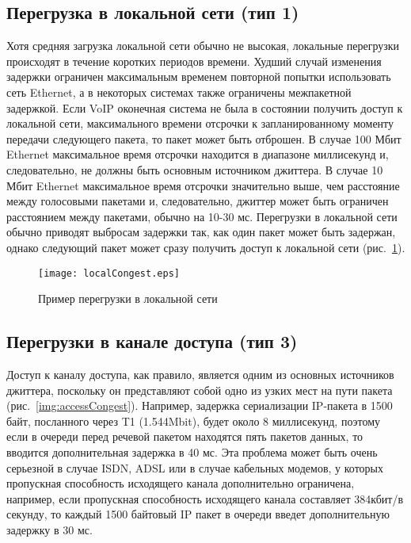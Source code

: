 \subsection{Перегрузка в локальной сети (тип 1)} \label{subsect2_1_2}
Хотя средняя загрузка локальной сети обычно не высокая, локальные перегрузки происходят в течение коротких периодов времени. Худший случай изменения задержки ограничен максимальным временем повторной попытки использовать сеть Ethernet, а в некоторых системах также ограничены межпакетной задержкой.
Если VoIP оконечная система не была в состоянии получить доступ к локальной сети, максимального времени отсрочки к запланированному моменту передачи следующего пакета, то пакет может быть отброшен. В случае 100 Мбит Ethernet максимальное время отсрочки находится в диапазоне миллисекунд и, следовательно, не должны быть основным источником джиттера. В случае 10 Мбит Ethernet максимальное время отсрочки значительно выше, чем расстояние между голосовыми пакетами и, следовательно, джиттер может быть ограничен расстоянием между пакетами, обычно на 10-30 мс.
Перегрузки в локальной сети обычно приводят выбросам задержки так, как один пакет может быть задержан, однако следующий пакет может сразу получить доступ к локальной сети (рис. \ref{img:localCongest}).

\begin{figure} [h]
  \center
\texttt{[image: localCongest.eps]}
  \caption{Пример перегрузки в локальной сети \cite{clark}}
  \label{img:localCongest}
\end{figure}

\subsection{Перегрузки в канале доступа (тип 3) } \label{subsect2_1_3}
Доступ к каналу доступа, как правило, является одним из основных источников джиттера, поскольку он представляют собой одно из узких мест на пути пакета (рис. \ref{img:accessCongest}). Например, задержка сериализации IP-пакета в 1500 байт, посланного через T1 (1.544Mbit), будет около 8 миллисекунд, поэтому если в очереди перед речевой пакетом находятся пять пакетов данных, то вводится дополнительная задержка в 40 мс. Эта проблема может быть очень серьезной в случае ISDN, ADSL или в случае кабельных модемов, у которых пропускная способность исходящего канала дополнительно ограничена, например, если пропускная способность исходящего канала составляет 384кбит/в секунду, то каждый 1500 байтовый IP пакет в очереди введет дополнительную задержку в 30 мс.

